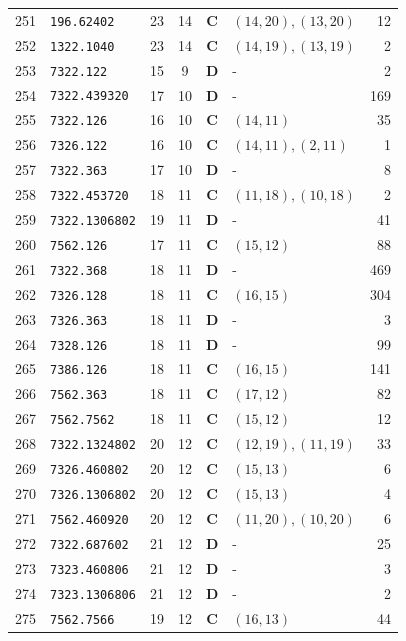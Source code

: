 \documentclass[11pt,a4paper]{article}
\begin{document}
\begin{small}
\begin{longtable}{r l c c c l r}
251 & \texttt{196.62402} & 23 & 14 & \textbf{C} & $(14,20), (13,20)$ & 12 \\
252 & \texttt{1322.1040} & 23 & 14 & \textbf{C} & $(14,19), (13,19)$ & 2 \\
253 & \texttt{7322.122} & 15 & 9 & \textbf{D} & - & 2 \\
254 & \texttt{7322.439320} & 17 & 10 & \textbf{D} & - & 169 \\
255 & \texttt{7322.126} & 16 & 10 & \textbf{C} & $(14,11)$ & 35 \\
256 & \texttt{7326.122} & 16 & 10 & \textbf{C} & $(14,11), (2,11)$ & 1 \\
257 & \texttt{7322.363} & 17 & 10 & \textbf{D} & - & 8 \\
258 & \texttt{7322.453720} & 18 & 11 & \textbf{C} & $(11,18), (10,18)$ & 2 \\
259 & \texttt{7322.1306802} & 19 & 11 & \textbf{D} & - & 41 \\
260 & \texttt{7562.126} & 17 & 11 & \textbf{C} & $(15,12)$ & 88 \\
261 & \texttt{7322.368} & 18 & 11 & \textbf{D} & - & 469 \\
262 & \texttt{7326.128} & 18 & 11 & \textbf{C} & $(16,15)$ & 304 \\
263 & \texttt{7326.363} & 18 & 11 & \textbf{D} & - & 3 \\
264 & \texttt{7328.126} & 18 & 11 & \textbf{D} & - & 99 \\
265 & \texttt{7386.126} & 18 & 11 & \textbf{C} & $(16,15)$ & 141 \\
266 & \texttt{7562.363} & 18 & 11 & \textbf{C} & $(17,12)$ & 82 \\
267 & \texttt{7562.7562} & 18 & 11 & \textbf{C} & $(15,12)$ & 12 \\
268 & \texttt{7322.1324802} & 20 & 12 & \textbf{C} & $(12,19), (11,19)$ & 33 \\
269 & \texttt{7326.460802} & 20 & 12 & \textbf{C} & $(15,13)$ & 6 \\
270 & \texttt{7326.1306802} & 20 & 12 & \textbf{C} & $(15,13)$ & 4 \\
271 & \texttt{7562.460920} & 20 & 12 & \textbf{C} & $(11,20), (10,20)$ & 6 \\
272 & \texttt{7322.687602} & 21 & 12 & \textbf{D} & - & 25 \\
273 & \texttt{7323.460806} & 21 & 12 & \textbf{D} & - & 3 \\
274 & \texttt{7323.1306806} & 21 & 12 & \textbf{D} & - & 2 \\
275 & \texttt{7562.7566} & 19 & 12 & \textbf{C} & $(16,13)$ & 44 \\

\end{longtable}
\end{small}
\end{document}
